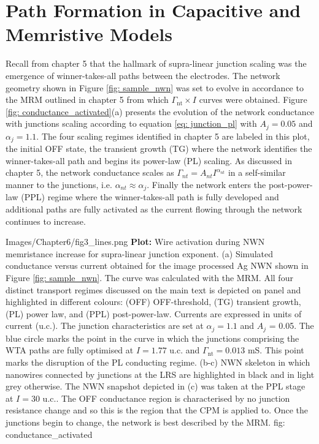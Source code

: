 \section{Path Formation in Capacitive and Memristive Models}
\label{Sec: mrm_cpm_activations}
Recall from chapter 5 that the hallmark of supra-linear junction scaling was the emergence of winner-takes-all paths between the electrodes. The network geometry shown in Figure \ref{fig: sample_nwn} was set to evolve in accordance to the MRM outlined in chapter 5 from which $\Gamma_{\textrm{nt}} \times I$ curves were obtained. Figure \ref{fig: conductance_activated}(a) presents the evolution of the network conductance with junctions scaling according to equation \ref{eq: junction_pl} with $A_j = 0.05$ and $\alpha_j = 1.1$. The four scaling regimes identified in chapter 5 are labeled in this plot, the initial OFF state, the transient growth (TG) where the network identifies the winner-takes-all path and begins its power-law (PL) scaling. As discussed in chapter 5, the network conductance scales as $\Gamma_{nt} = A_{nt} I^{\alpha_{nt}}$ in a self-similar manner to the junctions, i.e. $\alpha_{nt} \approx \alpha_j$. Finally the network enters the post-power-law (PPL) regime where the winner-takes-all path is fully developed and additional paths are fully activated as the current flowing through the network continues to increase. 

{Images/Chapter6/fig3_lines.png}
{\textbf{Plot:} Wire activation during NWN memristance increase for supra-linear junction exponent.} 
{(a) Simulated conductance versus current obtained for the image processed Ag NWN shown in Figure \ref{fig: sample_nwn}. The curve was calculated with the MRM. All four distinct transport regimes discussed on the main text is depicted on panel and highlighted in different colours: (OFF) OFF-threshold, (TG) transient growth, (PL) power law, and (PPL) post-power-law. Currents are expressed in units of current (u.c.). The junction characteristics are set at $\alpha_j=1.1$ and $A_j$ = 0.05. The blue circle marks the point in the curve in which the junctions comprising the WTA paths are fully optimised at $I = 1.77$ u.c. and  $\Gamma_{\textrm{nt}} = 0.013$ mS. This point marks the disruption of the PL conducting regime. (b-c) NWN skeleton in which nanowires connected by junctions at the LRS are highlighted in black and in light grey otherwise. The NWN snapshot depicted in (c) was taken at the PPL stage at $I = 30$ u.c.. The OFF conductance region is characterised by no junction resistance change and so this is the region that the CPM is applied to. Once the junctions begin to change, the network is best described by the MRM\cite{ocallaco2018}.}
{fig: conductance_activated}

